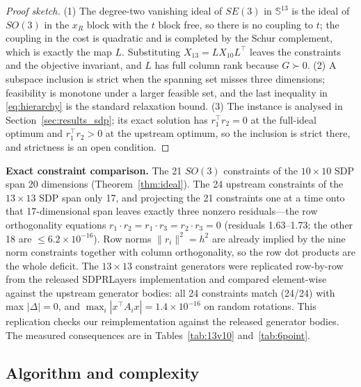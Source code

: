 \begin{proof}[Proof sketch]
(1) The degree-two vanishing ideal of $SE(3)$ in $\mathbb{S}^{13}$ is the ideal of $SO(3)$ in the $x_R$ block with the $t$ block free, so there is no coupling to $t$; the coupling in the cost is quadratic and is completed by the Schur complement, which is exactly the map $L$. Substituting $X_{13}=LX_{10}L^\top$ leaves the constraints and the objective invariant, and $L$ has full column rank because $G\succ0$. (2) A subspace inclusion is strict when the spanning set misses three dimensions; feasibility is monotone under a larger feasible set, and the last inequality in \eqref{eq:hierarchy} is the standard relaxation bound. (3) The instance is analysed in Section~\ref{sec:results_sdp}; its exact solution has $r_1^\top r_2=0$ at the full-ideal optimum and $r_1^\top r_2>0$ at the upstream optimum, so the inclusion is strict there, and strictness is an open condition.
\end{proof}

\textbf{Exact constraint comparison.} The 21 $SO(3)$ constraints of the $10\times10$ SDP span 20 dimensions (Theorem~\ref{thm:ideal}). The 24 upstream constraints of the $13\times13$ SDP span only 17, and projecting the 21 constraints one at a time onto that 17-dimensional span leaves exactly three nonzero residuals---the row orthogonality equations $r_1\cdot r_2=r_1\cdot r_3=r_2\cdot r_3=0$ (residuals 1.63--1.73; the other 18 are $\le6.2\times10^{-16}$). Row norms $\|r_i\|^2=h^2$ are already implied by the nine norm constraints together with column orthogonality, so the row dot products are the whole deficit. The $13\times13$ constraint generators were replicated row-by-row from the released SDPRLayers implementation and compared element-wise against the upstream generator bodies: all 24 constraints match (24/24) with max $|\Delta|=0$, and $\max_i|x^\top A_i x|=1.4\times10^{-16}$ on random rotations. This replication checks our reimplementation against the released generator bodies. The measured consequences are in Tables~\ref{tab:13v10} and~\ref{tab:6point}.

\subsection{Algorithm and complexity}\label{sec:algorithm}

